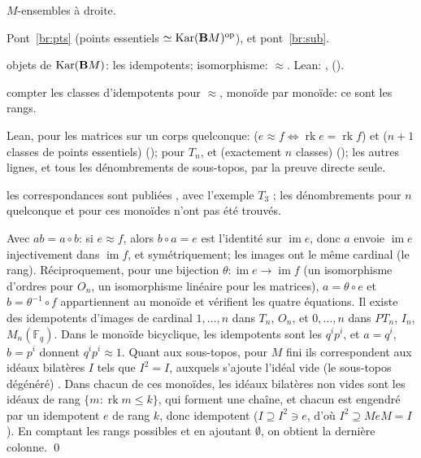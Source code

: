 \begin{trace}
\item[tablier] $M$-ensembles à droite.
\item[arche] Pont~\ref{br:pts} (points essentiels $\simeq\operatorname{Kar}(\mathbf{B} M)^{\mathrm{op}}$), et pont~\ref{br:sub}.
\item[spécialiser] objets de $\operatorname{Kar}(\mathbf{B} M)$: les idempotents; isomorphisme: $\approx$. Lean: ,  ().
\item[réécrire] compter les classes d'idempotents pour $\approx$, monoïde par monoïde: ce sont les rangs.
\item[vérifier] Lean, pour les matrices sur un corps quelconque:  ($e\approx f\iff\operatorname{rk}e=\operatorname{rk}f$) et  ($n+1$ classes de points essentiels) (); pour $T_n$,  et  (exactement $n$ classes) (); les autres lignes, et tous les dénombrements de sous-topos, par la preuve directe seule.
\item[nouveauté] les correspondances sont publiées \cite{rogers-1905,pirashvili-jncg}, avec l'exemple $T_3$ \cite[Ex.~6.1.5]{pirashvili-jncg}; les dénombrements pour $n$ quelconque et pour ces monoïdes n'ont pas été trouvés.
\end{trace}

\direct{} Avec $ab = a\circ b$: si $e\approx f$, alors $b\circ a = e$ est l'identité sur $\operatorname{im}e$, donc $a$ envoie $\operatorname{im}e$ injectivement dans $\operatorname{im}f$, et symétriquement; les images ont le même cardinal (le rang). Réciproquement, pour une bijection $\theta : \operatorname{im}e\to\operatorname{im}f$ (un isomorphisme d'ordres pour $O_n$, un isomorphisme linéaire pour les matrices), $a = \theta\circ e$ et $b = \theta^{-1}\circ f$ appartiennent au monoïde et vérifient les quatre équations. Il existe des idempotents d'images de cardinal $1,\dots,n$ dans $T_n$, $O_n$, et $0,\dots,n$ dans $PT_n$, $I_n$, $M_n(\mathbb F_q)$. Dans le monoïde bicyclique, les idempotents sont les $q^ip^i$, et $a = q^i$, $b = p^i$ donnent $q^ip^i\approx 1$. Quant aux sous-topos, pour $M$ fini ils correspondent aux idéaux bilatères $I$ tels que $I^2 = I$, auxquels s'ajoute l'idéal vide (le sous-topos dégénéré) \cite[Prop.~6.1.2]{pirashvili-jncg}. Dans chacun de ces monoïdes, les idéaux bilatères non vides sont les idéaux de rang $\{m : \operatorname{rk}m\le k\}$, qui forment une chaîne, et chacun est engendré par un idempotent $e$ de rang $k$, donc idempotent ($I\supseteq I^2\ni e$, d'où $I^2\supseteq MeM = I$). En comptant les rangs possibles et en ajoutant $\emptyset$, on obtient la dernière colonne.
\qed

